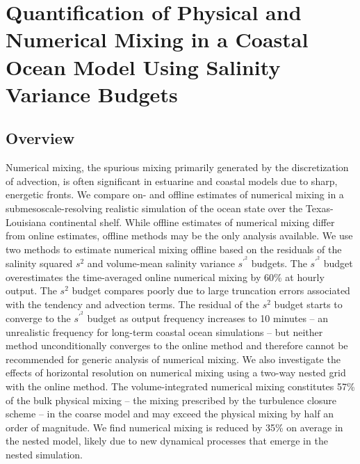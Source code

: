 


\chapter[footnote={This paper is published in the \textit{Journal of Advances in Modeling Earth Systems}. Reprinted with permission from the \textit{American Geophysical Union} under the terms of the CC BY 4.0 license. Full citation:  Schlichting, D., Qu, L., Kobashi, D., \& Hetland, R.D. (2023). Quantification of physical and numerical mixing in a coastal ocean model using salinity variance budgets. \textit{Journal of Advances in Modeling Earth Systems}, 15, e2022MS003380. \url{https://doi.org/10.1029/2022MS003380}}]{Quantification of Physical and Numerical Mixing in a Coastal Ocean Model Using Salinity Variance Budgets}

\section{Overview}
Numerical mixing, the spurious mixing primarily generated by the discretization of advection, is often significant in estuarine and coastal models due to sharp, energetic fronts. We compare on- and offline estimates of numerical mixing in a submesoscale-resolving realistic simulation of the ocean state over the Texas-Louisiana continental shelf. While offline estimates of numerical mixing differ from online estimates, offline methods may be the only analysis available. We use two methods to estimate numerical mixing offline based on the residuals of the salinity squared $s^2$ and volume-mean salinity variance $s^{\prime^2}$ budgets. The $s^{\prime^2}$ budget overestimates the time-averaged online numerical mixing by 60\% at hourly output. The $s^2$ budget compares poorly due to large truncation errors associated with the tendency and advection terms. The residual of the $s^2$ budget starts to converge to the $s^{\prime^2}$ budget as output frequency increases to 10 minutes -- an unrealistic frequency for long-term coastal ocean simulations -- but neither method unconditionally converges to the online method and therefore cannot be recommended for generic analysis of numerical mixing. We also investigate the effects of horizontal resolution on numerical mixing using a two-way nested grid with the online method. The volume-integrated numerical mixing constitutes 57\% of the bulk physical mixing -- the mixing prescribed by the turbulence closure scheme -- in the coarse model and may exceed the physical mixing by half an order of magnitude. We find numerical mixing is reduced by 35\% on average in the nested model, likely due to new dynamical processes that emerge in the nested simulation.

